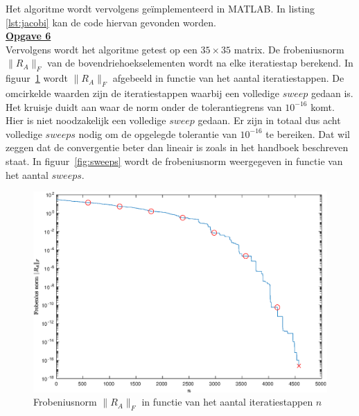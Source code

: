 \documentclass[a4paper, 12pt, titlepage, fleqn]{article}
\begin{document}
Het algoritme wordt vervolgens ge\"implementeerd in MATLAB. In listing \ref{lst:jacobi} kan de code hiervan gevonden worden.\\

\underline{\textbf{Opgave 6}}\\

 Vervolgens wordt het algoritme getest op een $35\times35$ matrix. De frobeniusnorm $\|R_A\|_F$ van de bovendriehoekselementen wordt na elke iteratiestap berekend. In figuur~\ref{fig:jacobiFout} wordt $\|R_A\|_F$ afgebeeld in functie van het aantal iteratiestappen. De omcirkelde waarden zijn de iteratiestappen waarbij een volledige $sweep$ gedaan is. Het kruisje duidt aan waar de norm onder de tolerantiegrens van $10^{-16}$ komt. Hier is niet noodzakelijk een volledige $sweep$ gedaan. Er zijn in totaal dus acht volledige $sweeps$ nodig om de opgelegde tolerantie van $10^{-16}$ te bereiken. Dat wil zeggen dat de convergentie beter dan lineair is zoals in het handboek beschreven staat. In figuur~\ref{fig:sweeps} wordt de frobeniusnorm weergegeven in functie van het aantal $sweeps$. 

\begin{figure}
 \centering
 \includegraphics[scale=0.55]{../Afbeeldingen/fout-jacobi.eps}
 \caption{Frobeniusnorm $\|R_A\|_F$ in functie van het aantal iteratiestappen $n$}
 \label{fig:jacobiFout}
 \end{figure} 
 
\end{document}
